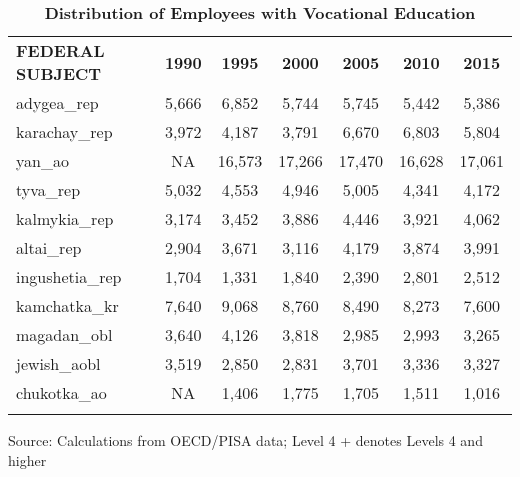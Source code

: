 \documentclass[alpha-refs,fleqn]{wiley-article_p2}
\begin{document}
\setcounter{table}{1} 
\renewcommand{\thetable}{A\arabic{table}}
\smaller
\begin{table}[h]
\caption{\textbf{Distribution of Employees with Vocational Education}}\label{table:a1}
\begin{threeparttable}
\setlength{\tabcolsep}{5pt}
\renewcommand{\arraystretch}{1.25}
\begin{tabular}{p{5.5cm}cccccc}
\rowcolor{grey!30} 
\textbf{FEDERAL SUBJECT}	&	\textbf{1990}	&	\textbf{1995}	&	\textbf{2000}	&	\textbf{2005}	&	\textbf{2010}	&	\textbf{2015} 	\\
adygea\_rep	&	5,666	&	6,852	&	5,744	&	5,745	&	5,442	&	5,386	\\
karachay\_rep	&	3,972	&	4,187	&	3,791	&	6,670	&	6,803	&	5,804	\\
yan\_ao	&	NA	&	16,573	&	17,266	&	17,470	&	16,628	&	17,061	\\
tyva\_rep	&	5,032	&	4,553	&	4,946	&	5,005	&	4,341	&	4,172	\\
kalmykia\_rep	&	3,174	&	3,452	&	3,886	&	4,446	&	3,921	&	4,062	\\
altai\_rep	&	2,904	&	3,671	&	3,116	&	4,179	&	3,874	&	3,991	\\
ingushetia\_rep	&	1,704	&	1,331	&	1,840	&	2,390	&	2,801	&	2,512	\\
kamchatka\_kr	&	7,640	&	9,068	&	8,760	&	8,490	&	8,273	&	7,600	\\
magadan\_obl	&	3,640	&	4,126	&	3,818	&	2,985	&	2,993	&	3,265	\\
jewish\_aobl	&	3,519	&	2,850	&	2,831	&	3,701	&	3,336	&	3,327	\\
chukotka\_ao	&	NA	&	1,406	&	1,775	&	1,705	&	1,511	&	1,016	\\
 	&	\hspace{4em}	&	\hspace{4em}	&	\hspace{4em}	&	\hspace{4em} &	\hspace{4em} &	\hspace{4em}	\\
\hline  %
\end{tabular}
\begin{tablenotes}
\item Source: Calculations from OECD/PISA data; Level 4 + denotes Levels 4 and higher
\end{tablenotes}
\end{threeparttable}
\vspace{4in}
\end{table}
\end{document}
